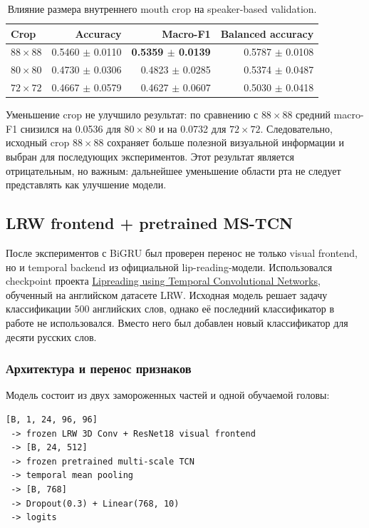 \documentclass[12pt,a4paper]{article}
\begin{document}
\begin{table}[htbp]
\centering
\begin{tabularx}{\textwidth}{>{\raggedright\arraybackslash}Xrrr}
\toprule
Crop & Accuracy & Macro-F1 & Balanced accuracy \\
\midrule
$88\times88$ & 0.5460 $\pm$ 0.0110 & \textbf{0.5359 $\pm$ 0.0139} & 0.5787 $\pm$ 0.0108 \\
$80\times80$ & 0.4730 $\pm$ 0.0306 & 0.4823 $\pm$ 0.0285 & 0.5374 $\pm$ 0.0487 \\
$72\times72$ & 0.4667 $\pm$ 0.0579 & 0.4627 $\pm$ 0.0607 & 0.5030 $\pm$ 0.0418 \\
\bottomrule
\end{tabularx}
\caption{Влияние размера внутреннего mouth crop на speaker-based validation.}
\end{table}

Уменьшение crop не улучшило результат: по сравнению с $88\times88$ средний
macro-F1 снизился на 0.0536 для $80\times80$ и на 0.0732 для $72\times72$.
Следовательно, исходный crop $88\times88$ сохраняет больше полезной визуальной
информации и выбран для последующих экспериментов. Этот результат является
отрицательным, но важным: дальнейшее уменьшение области рта не следует
представлять как улучшение модели.

\subsection{LRW frontend + pretrained MS-TCN}

После экспериментов с BiGRU был проверен перенос не только visual frontend,
но и temporal backend из официальной lip-reading-модели. Использовался
checkpoint проекта \href{https://github.com/mpc001/Lipreading\_using\_Temporal\_Convolutional\_Networks}{Lipreading using Temporal Convolutional Networks},
обученный на английском датасете LRW. Исходная модель решает задачу
классификации 500 английских слов, однако её последний классификатор в работе
не использовался. Вместо него был добавлен новый классификатор для десяти
русских слов.

\subsubsection{Архитектура и перенос признаков}

Модель состоит из двух замороженных частей и одной обучаемой головы:

\begin{verbatim}
[B, 1, 24, 96, 96]
 -> frozen LRW 3D Conv + ResNet18 visual frontend
 -> [B, 24, 512]
 -> frozen pretrained multi-scale TCN
 -> temporal mean pooling
 -> [B, 768]
 -> Dropout(0.3) + Linear(768, 10)
 -> logits
\end{verbatim}
\end{document}
